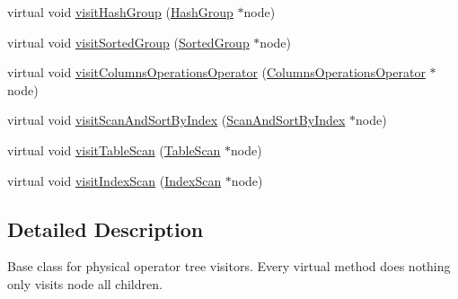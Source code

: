 \begin{DoxyCompactItemize}
\item 
virtual void \hyperlink{classrafe_1_1_physical_operator_visitor_ab6a2b2b02f2237fd41e6c44f5b2ede9b}{visit\+Hash\+Group} (\hyperlink{classrafe_1_1_hash_group}{Hash\+Group} $\ast$node)
\item 
virtual void \hyperlink{classrafe_1_1_physical_operator_visitor_afb1b6786bf12f12e3b1c2895bf77e874}{visit\+Sorted\+Group} (\hyperlink{classrafe_1_1_sorted_group}{Sorted\+Group} $\ast$node)
\item 
virtual void \hyperlink{classrafe_1_1_physical_operator_visitor_ab69b85d7a2c8f89986d84cbcce6f2f89}{visit\+Columns\+Operations\+Operator} (\hyperlink{classrafe_1_1_columns_operations_operator}{Columns\+Operations\+Operator} $\ast$node)
\item 
virtual void \hyperlink{classrafe_1_1_physical_operator_visitor_a4f8cbef9d1c5a58fceb44deb4a7d998c}{visit\+Scan\+And\+Sort\+By\+Index} (\hyperlink{classrafe_1_1_scan_and_sort_by_index}{Scan\+And\+Sort\+By\+Index} $\ast$node)
\item 
virtual void \hyperlink{classrafe_1_1_physical_operator_visitor_ae3d5b2b56e9465713c5ecd4e5fcea9c9}{visit\+Table\+Scan} (\hyperlink{classrafe_1_1_table_scan}{Table\+Scan} $\ast$node)
\item 
virtual void \hyperlink{classrafe_1_1_physical_operator_visitor_ac33ea100cdb3e642a58a82c4367de3fd}{visit\+Index\+Scan} (\hyperlink{classrafe_1_1_index_scan}{Index\+Scan} $\ast$node)
\end{DoxyCompactItemize}


\subsection{Detailed Description}
Base class for physical operator tree visitors. Every virtual method does nothing only visits node all children. 

